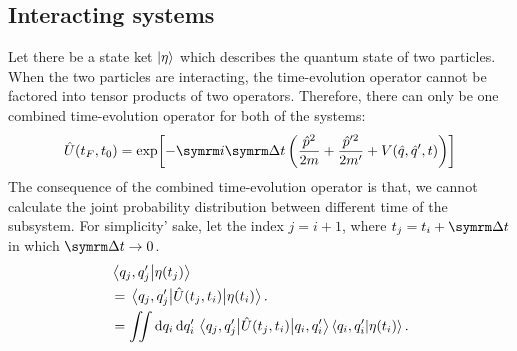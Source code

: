 \subsection{Interacting systems}

Let there be a state ket $\ket{\eta}$ which describes the quantum state of two particles. When the two particles are interacting, the time-evolution operator cannot be factored into tensor products of two operators. Therefore, there can only be one combined time-evolution operator for both of the systems:
\begin{equation}
    \hat{U}(t_F, t_0) = \exp[-\im\Dd{t}\left(\frac{\hat{p}^2}{2m} + \frac{\hat{p}'^2}{2m'} + V(\hat{q}, \hat{q}', t)\right)]
\end{equation}
The consequence of the combined time-evolution operator is that, we cannot calculate the joint probability distribution between different time of the subsystem. For simplicity’ sake, let the index $j = i + 1$, where $t_j = t_i + \Dd{t}$ in which $\Dd{t} \appr 0$.
\begin{align}
    &\braket{q_j, q_j'}{\eta(t_j)} \\
    &= \mel{q_j, q_j'}{\hat{U}(t_j, t_i)}{\eta(t_i)}. \\
    &= \iint \dd{q_i}\dd{q_i'} \mel{q_j, q_j'}{\hat{U}(t_j, t_i)}{q_i, q_i'}\braket{q_i, q_i'}{\eta(t_i)}.
\end{align}


